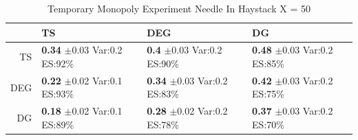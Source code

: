 \documentclass[11pt,letterpaper]{article}
\begin{document}
\begin{table}[H]
\centering
\caption{Temporary Monopoly Experiment Needle In Haystack X = 50} 
\begin{tabular}{rlll}
  \hline
 & TS & DEG &  DG \\ 
  \hline
TS & \makecell{\textbf{0.34} $\pm$0.03\\Var:0.2\\ES:92\%} & \makecell{\textbf{0.4} $\pm$0.03\\Var:0.2\\ES:90\%} & \makecell{\textbf{0.48} $\pm$0.03\\Var:0.2\\ES:85\%} \\ 
  DEG & \makecell{\textbf{0.22} $\pm$0.02\\Var:0.1\\ES:93\%} & \makecell{\textbf{0.34} $\pm$0.03\\Var:0.2\\ES:83\%} & \makecell{\textbf{0.42} $\pm$0.03\\Var:0.2\\ES:75\%} \\ 
   DG & \makecell{\textbf{0.18} $\pm$0.02\\Var:0.1\\ES:89\%} & \makecell{\textbf{0.28} $\pm$0.02\\Var:0.2\\ES:78\%} & \makecell{\textbf{0.37} $\pm$0.03\\Var:0.2\\ES:70\%} \\ 
   \hline
\end{tabular}
\end{table}
\end{document}
